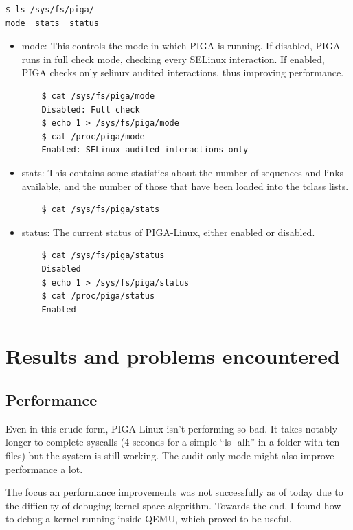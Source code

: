 \documentclass[pdftex,a4paper,titlepage,11pt]{article}
\begin{document}
\begin{lstlisting}
$ ls /sys/fs/piga/
mode  stats  status
\end{lstlisting}

\begin{itemize}
	\item mode: This controls the mode in which PIGA is running. If disabled,
PIGA runs in full check mode, checking every SELinux interaction. If enabled,
PIGA checks only selinux audited interactions, thus improving performance.
	\begin{lstlisting}
	$ cat /sys/fs/piga/mode
	Disabled: Full check
	$ echo 1 > /sys/fs/piga/mode
	$ cat /proc/piga/mode
	Enabled: SELinux audited interactions only
	\end{lstlisting}
	\item stats: This contains some statistics about the number of sequences and
links available, and the number of those that have been loaded into the tclass
lists.
	\begin{lstlisting}
	$ cat /sys/fs/piga/stats
	\end{lstlisting}
	\item status: The current status of PIGA-Linux, either enabled or disabled.
	\begin{lstlisting}
	$ cat /sys/fs/piga/status
	Disabled
	$ echo 1 > /sys/fs/piga/status
	$ cat /proc/piga/status
	Enabled
	\end{lstlisting}
\end{itemize}

\newpage

\section{Results and problems encountered}

\subsection{Performance}

Even in this crude form, PIGA-Linux isn't performing so bad. It takes notably
longer to complete syscalls (4 seconds for a simple ``ls -alh'' in a folder with
ten files) but the system is still working. The audit only mode might also
improve performance a lot.

The focus an performance improvements was not successfully as of today due to
the difficulty of debuging kernel space algorithm. Towards the end, I found
how to debug a kernel running inside QEMU, which proved to be useful.
\end{document}
